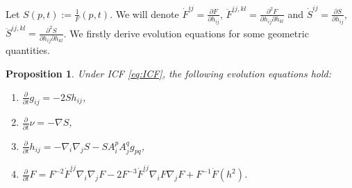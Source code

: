 \documentclass[reqno]{amsart}
\newtheorem{proposition}[theorem]{Proposition}
\theoremstyle{remark}
\newcommand{\pd}[2]{\frac{\partial {#1}}{\partial {#2}}}
\theoremstyle{definition}
\numberwithin{equation}{section}
\begin{document}
Let \(S(p,t):=\frac{1}{F}(p,t)\). We will denote  $\dot{F}^{ij}=\frac{\partial F}{\partial h_{ij}}$, $\ddot{F}^{ij,kl}=\frac{\partial^2 F}{\partial h_{ij} \partial h_{kl}}$
and $\dot{S}^{ij}=\frac{\partial S}{\partial h_{ij}}$, $\ddot{S}^{ij,kl}=\frac{\partial^2 S}{\partial h_{ij} \partial h_{kl}}$. We firstly derive evolution equations for some geometric quantities.
\begin{proposition}\label{prop:evolution_geo_quantaties}
    Under ICF \eqref{eq:ICF}, the following evolution equations hold:
    \begin{enumerate}[label=(\arabic*)]
        \item \(\displaystyle \pd{}{t}g_{ij} = -2Sh_{ij}\),
        \item \(\displaystyle \pd{}{t}\nu = -\nabla S\),
        \item \(\displaystyle \pd{}{t}h_{ij} = -\nabla_i \nabla_j S - SA_i^p A_j^q g_{pq}\),
        \item \(\pd{}{t}F = F^{-2}\dot{F}^{ij}\nabla_i\nabla_j F - 2F^{-3}\dot{F}^{ij}\nabla_i F \nabla_j F + F^{-1}\dot{F}(h^2)\). 
    \end{enumerate}
\end{proposition}
\end{document}

